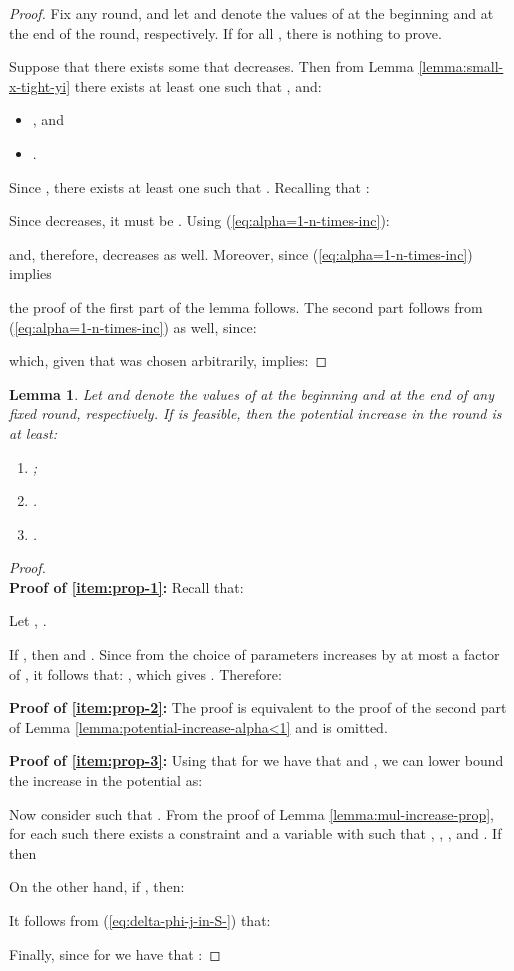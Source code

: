 \documentclass[11pt]{article}
\newtheorem{lemma}[theorem]{Lemma}
\begin{document}
\begin{proof}
Fix any round, and let  and  denote the values of  at the beginning and at the end of the round, respectively. If for all  , there is nothing to prove. 

Suppose that there exists some  that decreases. Then from Lemma \ref{lemma:small-x-tight-yi} there exists at least one  such that , and: 
\begin{itemize}
\item , and
\item .
\end{itemize}
Since , there exists at least one  such that . 
Recalling that :



Since  decreases, it must be . Using (\ref{eq:alpha=1-n-times-inc}):

and, therefore,  decreases as well. 
Moreover, since (\ref{eq:alpha=1-n-times-inc}) implies

the proof of the first part of the lemma follows. The second part follows from (\ref{eq:alpha=1-n-times-inc}) as well, since:

which, given that  was chosen arbitrarily, implies:

\end{proof}

\begin{lemma}\label{lemma:potential-increase-proportional}
Let  and  denote the values of  at the beginning and at the end of any fixed round, respectively. If  is feasible, then the potential increase in the round is at least:
\begin{enumerate}
\item \label{item:prop-1} ;
\item \label{item:prop-2} .
\item \label{item:prop-3} .
\end{enumerate}
\end{lemma}
\begin{proof}
\\
\noindent\textbf{Proof of \ref{item:prop-1}:}
Recall that:

Let , .

If , then  and . Since from the choice of parameters  increases by at most a factor of , it follows that: , which gives . Therefore:


\noindent\textbf{Proof of \ref{item:prop-2}:} The proof is equivalent to the proof of the second part of Lemma \ref{lemma:potential-increase-alpha<1} and is omitted.
 
\noindent\textbf{Proof of \ref{item:prop-3}:} Using that for  we have that  and , we can lower bound the increase in the potential as:

Now consider  such that . From the proof of Lemma \ref{lemma:mul-increase-prop}, for each such  there exists a constraint  and a variable  with  such that , , , and . If  then

On the other hand, if , then:

It follows from (\ref{eq:delta-phi-j-in-S-}) that:

Finally, since for  we have that :

\end{proof}
\end{document}
